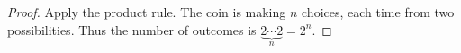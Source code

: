 \begin{proof}
Apply the product rule.
The coin is making $n$ choices, each time from two possibilities.
Thus the number of outcomes is $\underbrace{2  \cdots  2}_n = 2^n$.
\end{proof}
